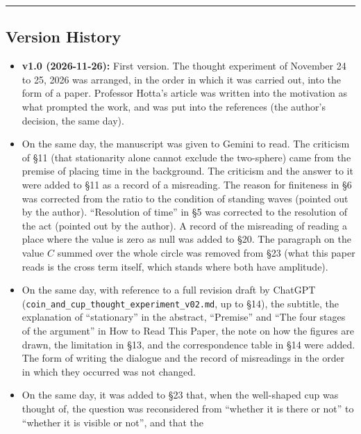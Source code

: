 \documentclass[
  a4paper,
]{article}
\providecommand{\tightlist}{%
  \setlength{\itemsep}{0pt}\setlength{\parskip}{0pt}}
\begin{document}
\begin{center}\rule{0.5\linewidth}{0.5pt}\end{center}

\subsection{Version History}\label{version-history}

\begin{itemize}
\tightlist
\item
  \textbf{v1.0 (2026-11-26):} First version. The thought experiment of
  November 24 to 25, 2026 was arranged, in the order in which it was
  carried out, into the form of a paper. Professor Hotta's article was
  written into the motivation as what prompted the work, and was put
  into the references (the author's decision, the same day).
\item
  On the same day, the manuscript was given to Gemini to read. The
  criticism of §11 (that stationarity alone cannot exclude the
  two-sphere) came from the premise of placing time in the background.
  The criticism and the answer to it were added to §11 as a record of a
  misreading. The reason for finiteness in §6 was corrected from the
  ratio to the condition of standing waves (pointed out by the author).
  ``Resolution of time'' in §5 was corrected to the resolution of the
  act (pointed out by the author). A record of the misreading of reading
  a place where the value is zero as null was added to §20. The
  paragraph on the value \(C\) summed over the whole circle was removed
  from §23 (what this paper reads is the cross term itself, which stands
  where both have amplitude).
\item
  On the same day, with reference to a full revision draft by ChatGPT
  (\texttt{coin\_\allowbreak{}and\_\allowbreak{}cup\_\allowbreak{}thought\_\allowbreak{}experiment\_\allowbreak{}v02.md}, up to §14), the
  subtitle, the explanation of ``stationary'' in the abstract,
  ``Premise'' and ``The four stages of the argument'' in How to Read
  This Paper, the note on how the figures are drawn, the limitation in
  §13, and the correspondence table in §14 were added. The form of
  writing the dialogue and the record of misreadings in the order in
  which they occurred was not changed.
\item
  On the same day, it was added to §23 that, when the well-shaped cup
  was thought of, the question was reconsidered from ``whether it is
  there or not'' to ``whether it is visible or not'', and that the

\end{itemize}
\end{document}
